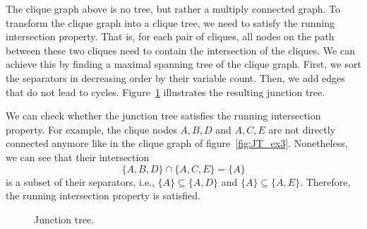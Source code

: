 \documentclass{article}
\begin{document}
\noindent The clique graph above is no tree, but rather a multiply connected graph. To transform the clique graph into a clique tree, we need to satisfy the running intersection property. That is, for each pair of cliques, all nodes on the path between these two cliques need to contain the intersection of the cliques. We can achieve this by finding a maximal spanning tree of the clique graph. First, we sort the separators in decreasing order by their variable count. Then, we add edges that do not lead to cycles. Figure~\ref{fig:JT_ex4} illustrates the resulting junction tree. 

We can check whether the junction tree satisfies the running intersection property. For example, the clique nodes $A, B, D$ and $A, C, E$ are not directly connected anymore like in the clique graph of figure~\ref{fig:JT_ex3}. Nonetheless, we can see that their intersection 
$$
    \{A, B, D\} \cap \{A, C, E\} = \{A\}
$$ 
\noindent is a subset of their separators, i.e., $\{A\} \subseteq \{A, D\}$ and $\{A\} \subseteq \{A, E\}$. Therefore, the running intersection property is satisfied.  

\begin{figure}[H]
    \centering
    \caption{Junction tree.}
    \label{fig:JT_ex4}
\end{figure}
\end{document}
